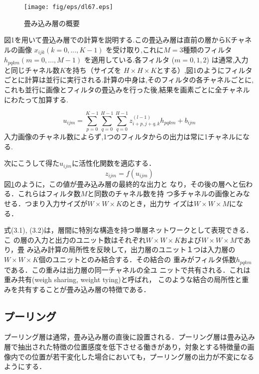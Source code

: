 \documentclass[a4paper,10pt]{jsarticle}
\begin{document}
\begin{figure}[t]
 \centering
 \texttt{[image: fig/eps/dl67.eps]}
  \caption{畳み込み層の概要}
  \label{fig:畳み込み層の概要}
\end{figure}

図1を用いて畳込み層での計算を説明する.この畳込み層は直前の層からKチャネルの画像 $x_{ijk} (k = 0,...,K − 1)$ を受け取り,これに$ M = 3 $種類のフィルタ $h_{pqkm} (m = 0,...,M − 1)$ を適用している.各フィルタ ($m = 0, 1, 2$) は通常,入力と同じチャネル数$K$を持ち（サイズを $H \times H \times K $とする）,図1のようにフィルタごとに計算は並行に実行される.計算の中身は,そのフィルタの各チャネルごとに,これも並行に画像とフィルタの畳込みを行った後,結果を画素ごとに全チャネルにわたって加算する.

\begin{equation}
  u_{ijm} = \sum_{p=0}^{K-1} \sum_{q=0}^{H-1} \sum_{q=0}^{H-1} z_{i+p,j+q,k}^{(l-1)} h_{pqkm}+b_{ijm}
\end{equation}
入力画像のチャネル数によらず,1つのフィルタからの出力は常に1チャネルになる.

次にこうして得た$u_{ijm}$に活性化関数を適応する．
\begin{equation}
 z_{ijm}=f(u_{ijm})
\end{equation}
図\ref{fig:畳み込み層の概要}のように，この値が畳み込み層の最終的な出力と
なり，その後の層へと伝わる．これらはフィルタ数$M$と同数のチャネル数を持
つ多チャネルの画像とみなせる．つまり入力サイズが$W\times W\times K$のとき，出力サ
イズは$W\times W\times M$になる．

式(3.1), (3.2)は，層間に特別な構造を持つ単層ネットワークとして表現できる．こ
の層の入力と出力のユニット数はそれぞれ$W\times W\times K$および$W\times W\times M$であり，畳
み込み計算の局所性を反映して，出力層のユニット１つは入力層の$W\times W\times K$個のユニットとのみ結合する．その結合の
重みがフィルタ係数$h_{pqkm}$である．この重みは出力層の同一チャネルの全ユ
ニットで共有される．これは重み共有(weigh sharing, weight tying)と呼ばれ，
このような結合の局所性と重みを共有することが畳み込み層の特徴である．

\subsection{プーリング}
プーリング層は通常，畳み込み層の直後に設置される．プーリング層は畳み込み層で抽出された特徴の位置感度を低下させる働きがあり，対象とする特徴量の画像内での位置が若干変化した場合においても，プーリング層の出力が不変になるようにする．
\end{document}
